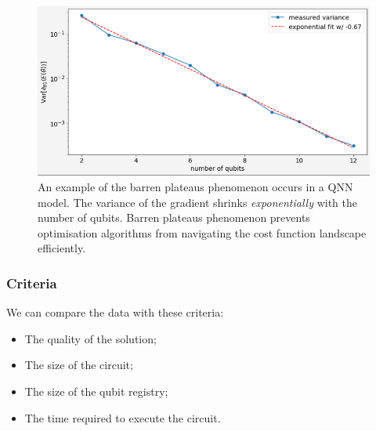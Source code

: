 \label{Research Activities section}
\begin{figure}
    \includegraphics[width=\textwidth]{./ResearchDesign/Appendices/VarianceShrinking.png}
    \caption{
        An example of the barren plateaus phenomenon occurs in a QNN model.
        The variance of the gradient shrinks \textit{exponentially} with the number of qubits.
        Barren plateaus phenomenon prevents optimisation algorithms from navigating the cost function landscape efficiently.
    }
    \label{Variance Shrinking demo}
\end{figure}


\subsubsection{Criteria}
\label{Criteria section}
We can compare the data with these criteria:
\begin{itemize}
    \item The quality of the solution;
    \item The size of the circuit;
    \item The size of the qubit registry;
    \item The time required to execute the circuit.
\end{itemize}

